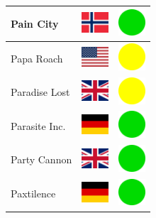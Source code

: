 \documentclass[12pt, a4paper, twoside]{report}
\begin{document}
\begin{center}
\begin{longtable}{|p{5cm}|p{2cm}|p{2cm}|}
 Pain City                                                  & \includegraphics[width=1cm]{../4x3/no} &   \includegraphics[width=1cm]{../likes/y} \\ \hline
 Papa Roach                                                 & \includegraphics[width=1cm]{../4x3/us} &   \includegraphics[width=1cm]{../likes/m} \\ \hline
 Paradise Lost                                              & \includegraphics[width=1cm]{../4x3/gb} &   \includegraphics[width=1cm]{../likes/m} \\ \hline
 Parasite Inc.                                              & \includegraphics[width=1cm]{../4x3/de} &   \includegraphics[width=1cm]{../likes/y} \\ \hline
 Party Cannon                                               & \includegraphics[width=1cm]{../4x3/gb} &   \includegraphics[width=1cm]{../likes/y} \\ \hline
 Paxtilence                                                 & \includegraphics[width=1cm]{../4x3/de} &   \includegraphics[width=1cm]{../likes/y} \\ \hline

\end{longtable}
\end{center}
\end{document}
